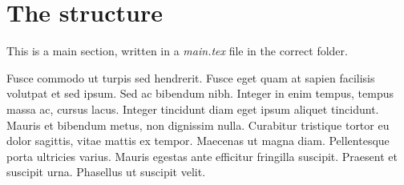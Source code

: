 \newpage
\section{The structure}
\label{sec:structure}

This is a main section, written in a \textit{main.tex} file in the correct folder. 

\medskip Fusce commodo ut turpis sed hendrerit. Fusce eget quam at sapien facilisis volutpat et sed ipsum. Sed ac bibendum nibh. Integer in enim tempus, tempus massa ac, cursus lacus. Integer tincidunt diam eget ipsum aliquet tincidunt. Mauris et bibendum metus, non dignissim nulla. Curabitur tristique tortor eu dolor sagittis, vitae mattis ex tempor. Maecenas ut magna diam. Pellentesque porta ultricies varius. Mauris egestas ante efficitur fringilla suscipit. Praesent et suscipit urna. Phasellus ut suscipit velit.